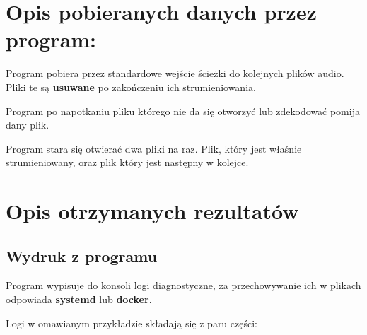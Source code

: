 \documentclass[a4paper,12pt]{article}
\begin{document}
\section{Opis pobieranych danych przez program:}

Program pobiera przez standardowe wejście ścieżki do kolejnych plików audio.
Pliki te są \textbf{usuwane} po zakończeniu ich strumieniowania.

Program po napotkaniu pliku którego nie da się otworzyć lub zdekodować pomija
dany plik. 

Program stara się otwierać dwa pliki na raz. Plik, który jest właśnie
strumieniowany, oraz plik który jest następny w kolejce.

\section{Opis otrzymanych rezultatów}

\subsection*{Wydruk z programu}

Program wypisuje do konsoli logi diagnostyczne, za przechowywanie ich w plikach
odpowiada \textbf{systemd} lub \textbf{docker}.

Logi w omawianym przykładzie składają się z paru części:
\end{document}
